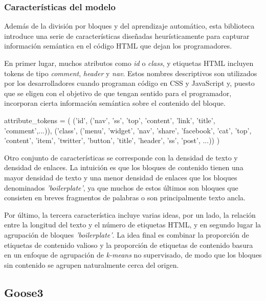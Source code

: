 \subsubsection{Características del modelo}
\label{subsubsec:carcateristicas del modelo}

Además de la división por bloques y del aprendizaje automático, esta biblioteca introduce una serie de 
características diseñadas heurísticamente para capturar información semántica en el código HTML que dejan
los programadores. 

En primer lugar, muchos atributos como \emph{id} o \emph{class}, y etiquetas HTML incluyen tokens de tipo 
\emph{comment}, \emph{header} y \emph{nav}. Estos nombres descriptivos son utilizados por los desarrolladores 
cuando programan código en CSS y JavaScript y, puesto que se eligen con el objetivo de que tengan sentido 
para el programador, incorporan cierta información semántica sobre el contenido del bloque.

\begin{Schunk}
  \begin{Soutput}
    attribute_tokens = (
      ('id',
        ('nav', 'ss', 'top', 'content', 'link', 'title', 'comment',...)),
      ('class',
        ('menu', 'widget', 'nav', 'share', 'facebook', 'cat', 'top', 'content',
        'item', 'twitter', 'button', 'title', 'header', 'ss', 'post', ...))
    )
  \end{Soutput}
\end{Schunk}

Otro conjunto de características se corresponde con la densidad de texto y densidad de enlaces. La intuición 
es que los bloques de contenido tienen una mayor densidad de texto y una menor densidad de enlaces que los 
bloques denominados \emph{'boilerplate'}, ya que muchos de estos últimos son bloques que consisten en breves
fragmentos de palabras o son principalmente texto ancla.

Por último, la tercera característica incluye varias ideas, por un lado, la relación entre la longitud del
texto y el número de etiquetas HTML, y en segundo lugar la agrupación de bloques \emph{'boilerplate'}. La 
idea final es combinar la proporción de etiquetas de contenido valioso y la proporción de etiquetas de 
contenido basura en un enfoque de agrupación de \emph{k-means} no supervisado, de modo que los bloques sin 
contenido se agrupen naturalmente cerca del origen.

\subsection{Goose3}
\label{subsec:goose3}

